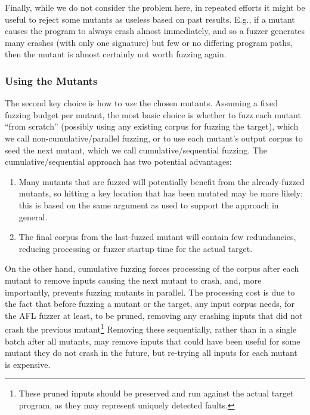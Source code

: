 Finally, while we do not consider the problem here, in repeated efforts it
might be useful to reject some mutants as useless based on past
results.  E.g., if a mutant causes the program to always crash almost
immediately, and so a fuzzer generates many crashes (with only one
signature) but few or no
differing program paths, then the mutant is almost certainly not worth
fuzzing again.

\subsubsection{Using the Mutants}
\label{sec:using}

The second key choice is how to \emph{use} the chosen mutants.
Assuming a fixed fuzzing budget per mutant, the most
basic choice is whether to fuzz each mutant ``from scratch'' (possibly using any existing corpus for
fuzzing the target), which we call non-cumulative/parallel fuzzing,  or to use each mutant's output corpus to seed the next mutant, which we call cumulative/sequential fuzzing.  The cumulative/sequential
approach has two potential advantages:

\begin{enumerate}
\item Many mutants that are fuzzed will potentially benefit from
the already-fuzzed mutants, so hitting a key location that has been
mutated may be more likely; this is based on the same argument as used to support
the approach in general.
\item The final corpus from the last-fuzzed mutant will contain few redundancies, reducing processing or
fuzzer startup time for the actual target.
\end{enumerate}

On the other hand, cumulative fuzzing forces processing of the corpus
after each mutant to remove inputs causing the next mutant to crash,
and, more importantly, prevents fuzzing mutants in parallel.  The
processing cost is due to the fact that before fuzzing a mutant or the
target, any input corpus needs, for the AFL fuzzer at least, to be
pruned, removing any crashing inputs that did not crash the previous
mutant\footnote{These pruned inputs should be preserved and run
  against the actual target program, as they may represent uniquely
  detected faults.}  Removing these sequentially, rather than in a
single batch after all mutants, may remove inputs that could have been
useful for some mutant they do not crash in the future, but re-trying
all inputs for each mutant is expensive.

